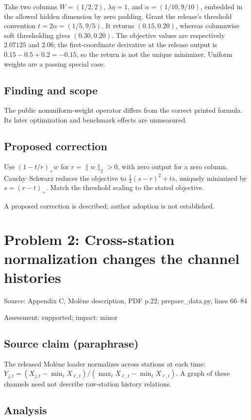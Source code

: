 \documentclass[11pt]{article}
\begin{document}
Take two columns \(W=(1/2,2)\), \(\lambda\eta=1\), and \(\alpha=(1/10,9/10)\), embedded in the allowed hidden dimension by zero padding. Grant the release’s threshold convention \(t=2\alpha=(1/5,9/5)\). It returns \((0.15,0.20)\), whereas columnwise soft thresholding gives \((0.30,0.20)\). The objective values are respectively \(2.07125\) and \(2.06\); the first-coordinate derivative at the release output is \(0.15-0.5+0.2=-0.15\), so the return is not the unique minimizer. Uniform weights are a passing special case.

\subsection*{Finding and scope}

The public nonuniform-weight operator differs from the correct printed formula. Its later optimization and benchmark effects are unmeasured.

\subsection*{Proposed correction}

Use \((1-t/r)_+w\) for \(r=\|w\|_2>0\), with zero output for a zero column. Cauchy–Schwarz reduces the objective to \(\tfrac12(s-r)^2+ts\), uniquely minimized by \(s=(r-t)_+\). Match the threshold scaling to the stated objective.

A proposed correction is described; author adoption is not established.

\section*{Problem 2: Cross-station normalization changes the channel histories}

Source: Appendix C, Moléne description, PDF p.22; prepare\_data.py, lines 66–84

Assessment: supported; impact: minor

\subsection*{Source claim (paraphrase)}

The released Moléne loader normalizes across stations at each time: \(Y_{j,t}=(X_{j,t}-\min_\ell X_{\ell,t})/(\max_\ell X_{\ell,t}-\min_\ell X_{\ell,t})\). A graph of these channels need not describe raw-station history relations.

\subsection*{Analysis}
\end{document}
